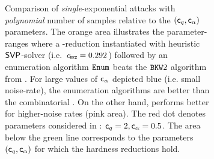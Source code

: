 \begin{figure}[h]
\begin{subfigure}[h]{0.99\textwidth}
		\caption[Comparison of algorithms for \LWE with polynomial number of samples]{
				 Comparison of \emph{single}-exponential attacks with \emph{polynomial} number of samples relative to the $(\mathsf{c}_q, \mathsf{c}_{\alpha})$ parameters. The orange area illustrates the parameter-ranges where a \BKZ-reduction instantiated with heuristic $\textsf{SVP}$-solver (i.e.\ $\cBKZ=0.292$) followed by an enumeration algorithm $\texttt{Enum}$ beats the $\texttt{BKW}2$ algorithm from \cite{C:GuoJohSta15, C:KirFou15}. For large values of $\mathsf{c}_{\alpha}$ depicted blue (i.e. small noise-rate), the enumeration algorithms are better than the combinatorial \BKW. On the other hand, \BKW performs better for higher-noise rates (pink area). The red dot denotes \LWE parameters considered in \cite{STOC:Regev05}: $\mathsf{c}_q=2, \mathsf{c}_{\alpha}=0.5$. The area below the green line corresponds to the parameters $(\mathsf{c}_q, \mathsf{c}_{\alpha})$ for which the hardness reductions hold.
		}
		\label{fig:SingExpPolySamples}
		\end{subfigure} 
		
		\begin{subfigure}[h]{0.99\textwidth}
		\centering
		\vspace*{20pt}
\end{subfigure}
\end{figure}
